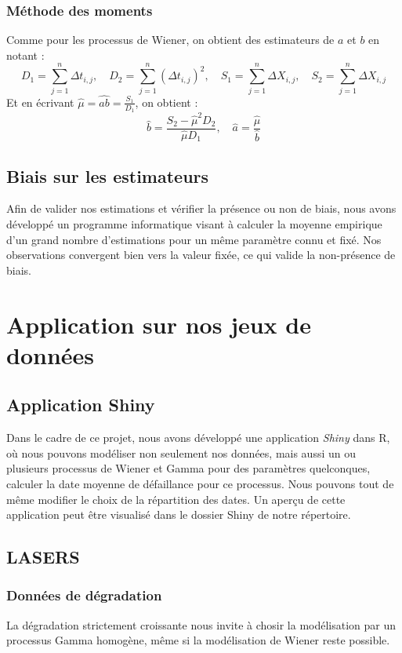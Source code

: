 \documentclass[11pt,a4paper]{article}
\begin{document}
\subsubsection{Méthode des moments} \label{estimateurs:gamma:moments}
Comme pour les processus de Wiener, on obtient des estimateurs de $a$ et $b$ en notant : $$D_1 = \sum_{j =1}^{n}\Delta t_{i,j}, \quad D_2 = \sum_{j =1}^{n}(\Delta t_{i,j})^2, \quad S_1 = \sum_{j =1}^{n}\Delta X_{i,j}, \quad S_2 = \sum_{j =1}^{n}\Delta X_{i,j}$$
Et en écrivant $\hat \mu = \hat{ab} = \frac{S_1}{D_1}$, on obtient : $$
\hat{b} = \frac{S_2 - \hat{\mu}^2D_2}{\hat{\mu}D_1}, \quad \hat{a} = \frac{\hat{\mu}}{\hat{b}}
$$

\subsection{Biais sur les estimateurs}
Afin de valider nos estimations et vérifier la présence ou non de biais, nous avons développé un programme informatique visant à calculer la moyenne empirique d'un grand nombre d'estimations pour un même paramètre connu et fixé. Nos observations convergent bien vers la valeur fixée, ce qui valide la non-présence de biais.

\section{Application sur nos jeux de données} \label{application}
\subsection{Application Shiny}
Dans le cadre de ce projet, nous avons développé une application \textit{Shiny} dans R, où nous pouvons modéliser non seulement nos données, mais aussi un ou plusieurs processus de Wiener et Gamma pour des paramètres quelconques, calculer la date moyenne de défaillance pour ce processus. Nous pouvons tout de même modifier le choix de la répartition des dates. Un aperçu de cette application peut être visualisé dans le dossier Shiny de notre répertoire.
\subsection{LASERS} \label{application:lasers}
\subsubsection{Données de dégradation} \label{application:lasers:degradation}
La dégradation strictement croissante nous invite à chosir la modélisation par un processus Gamma homogène, même si la modélisation de Wiener reste possible.
\end{document}
